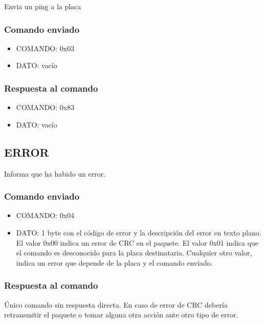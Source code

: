 \documentclass[a4paper,10pt]{article}
\begin{document}
Envia un ping a la placa

\subsubsection*{Comando enviado}
\label{ping_comando_enviado}

\begin{itemize}
	\item{COMANDO:} 0x03
	\item{DATO:} vac\'io
\end{itemize}

\subsubsection*{Respuesta al comando}
\label{ping_respuesta}

\begin{itemize}
	\item{COMANDO:} 0x83
	\item{DATO:} vac\'io
\end{itemize}

\subsection{ERROR}
\label{error}

Informa que ha habido un error.

\subsubsection*{Comando enviado}
\label{error_comando_enviado}

\begin{itemize}
	\item{COMANDO:} 0x04
	\item{DATO:} 1 byte con el c\'odigo de error y la descripci\'on del error en texto plano.
	El valor 0x00 indica un error de CRC en el paquete.
	El valor 0x01 indica que el comando es desconocido para la placa destinataria.
	Cualquier otro valor, indica un error que depende de la placa y el comando enviado.
\end{itemize}

\subsubsection*{Respuesta al comando}
\label{error_respuesta}

\'Unico comando sin respuesta directa.
En caso de error de CRC deber\'ia retransmitir el paquete o tomar alguna otra acci\'on ante otro tipo de error.
\end{document}
